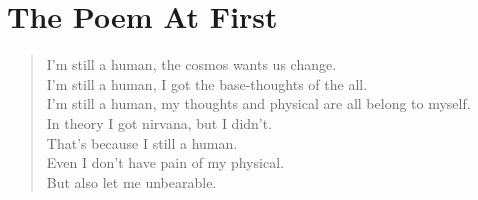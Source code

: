 \chapter{The Poem At First}
\begin{verse}
\textsf {\large I'm still a human, the cosmos wants us change.\\
I'm still a human, I got the base-thoughts of the all.\\
I'm still a human, my thoughts and physical are all belong to myself.\\
In theory I got nirvana, but I didn't.\\
That's because I still a human.\\
Even I don't have pain of my physical.\\
But also let me unbearable.
}
\end{verse}


